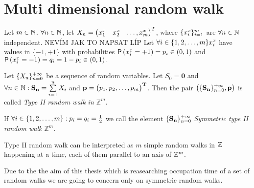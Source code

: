 \chapter{Multi dimensional random walk}
\renewcommand{\rw}{$\left( \{\mathbf{\mathbf{S_n}}\}_{n=0}^\pinf, \mathbf{p}\right)$}

\begin{defn}\label{defn-type_II}
  Let $m \in \mathbb{N}$. $\forall n \in \mathbb{N}$, let $X_n=\begin{pmatrix} \x[1] & \x[2]& \ldots, \x[m]\end{pmatrix}^T$, where $\{\x[i]\}_{i=1}^{m}$ are $\forall n \in \mathbb{N}$ independent.
  \ce NEVÍM JAK TO NAPSAT LÍP
  Let $\forall i \in \{1,2,\ldots, m\}\x[i]$ have values in $\{-1,+1\}$ with probabilities $\pr \left(\x[i]=+1\right)=p_i \in \left(0,1\right)$ and $\pr \left(\x[i]=-1\right)=q_i=1-p_i \in  \left(0,1 \right).$

  Let $\{X_n\}_{n=0}^{+\infty}$ be a sequence of \iid random variables. Let $S_0=\mathbf{0}$ and $\forall n \in \N: \mathbf{S_n}=\suma X_i$ and $\bf{p}=\begin{pmatrix}
   p_1, p_2, \ldots, p_m
 \end{pmatrix}^T$. Then the pair $\left(\{\mathbf{S_n}\}_{n=0}^{+\infty}, \mathbf{p} \right)$ is called \emph{Type II random walk in $\mathbb{Z}^m$}.

  If $\forall i \in \{1, 2, \ldots, m\}: p_i=q_i=\frac{1}{2}$ we call the \ce element $\{\mathbf{S_n}\}_{n=0}^{+\infty}$ \emph{Symmetric type II random walk $\mathbb{Z}^m$}.
\end{defn}
\begin{rem}
  Type II random walk can be interpreted as $m$ simple random walks in $\mathbb{Z}$ happening at a time, each of them parallel to an axis of $\mathbb{Z}^m$.
\end{rem}
\begin{rem}
  Due to the the aim of this thesis which is reasearching occupation time of a set of random walks we are going to concern only on symmetric random walks.
\end{rem}

